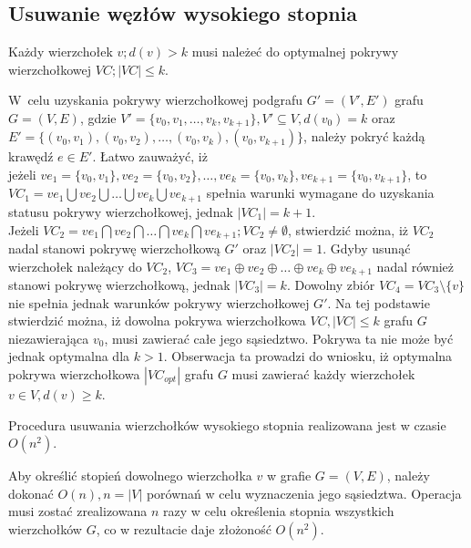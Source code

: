 \subsection{Usuwanie węzłów wysokiego stopnia}\label{section_kernelization_high-degree}

\begin{theorem}
  Każdy wierzchołek $v; d(v) > k$ musi należeć do optymalnej pokrywy wierzchołkowej 
  $VC; |VC| \leq k$.
\end{theorem}
\begin{bproof}
  W~celu uzyskania pokrywy wierzchołkowej podgrafu $G\prime=(V\prime,E\prime)$
  grafu $G=(V,E)$, gdzie $V\prime=\{v_0, v_1, \ldots, v_k, v_{k+1}\}, V\prime
  \subseteq V, d(v_0)=k$ oraz \\
  $E\prime=\{(v_0,v_1), (v_0,v_2), \ldots, (v_0, v_k), (v_0,v_{k+1})\}$,
  należy pokryć każdą krawędź $e \in E\prime$.
  Łatwo zauważyć, iż \\ jeżeli $ve_1=\{v_0,v_1\}, ve_2=\{v_0,v_2\}, \ldots,
  ve_k=\{v_0,v_k\},ve_{k+1}=\{v_0,v_{k+1}\}$,
  to ${VC_1=ve_1 \bigcup ve_2 \bigcup \ldots \bigcup ve_k \bigcup ve_{k+1}}$ spełnia warunki 
  wymagane do uzyskania statusu pokrywy wierzchołkowej, jednak $|VC_1| = k +1$.\\
  Jeżeli $VC_2=ve_1 \bigcap ve_2 \bigcap \ldots \bigcap ve_k \bigcap ve_{k+1}; VC_2 \neq \emptyset$,
  stwierdzić można, iż $VC_2$ nadal stanowi pokrywę wierzchołkową $G\prime$ oraz
  $|VC_2|=1$.
  Gdyby usunąć wierzchołek należący do $VC_2$, $VC_3=ve_1 \oplus ve_2 \oplus \ldots \oplus ve_k \oplus ve_{k+1}$ nadal
  również stanowi pokrywę wierzchołkową, jednak $|VC_3|=k$.
  Dowolny zbiór $VC_4=VC_3 \setminus \{v\}$ nie spełnia jednak warunków pokrywy
  wierzchołkowej $G\prime$.
  Na tej podstawie stwierdzić można, iż dowolna pokrywa wierzchołkowa 
  $VC, |VC| \leq k$ grafu $G$ niezawierająca $v_0$, musi zawierać całe jego
  sąsiedztwo. Pokrywa ta nie może być jednak optymalna dla $k > 1$.
  Obserwacja ta prowadzi do wniosku, iż optymalna pokrywa wierzchołkowa
  $|VC_{opt}|$ grafu $G$ musi zawierać każdy wierzchołek $v \in V, d(v) \geq k$.
\end{bproof}

\begin{theorem}
  Procedura usuwania wierzchołków wysokiego stopnia realizowana jest w czasie
  $O(n^2)$.
\end{theorem}
\begin{bproof}
  Aby określić stopień dowolnego wierzchołka $v$ w grafie $G=(V,E)$, należy 
  dokonać $O(n), n=|V|$ porównań w celu wyznaczenia jego sąsiedztwa.
  Operacja musi zostać zrealizowana $n$ razy w celu określenia stopnia
  wszystkich wierzchołków $G$, co w rezultacie daje złożoność $O (n^2)$.
\end{bproof}


